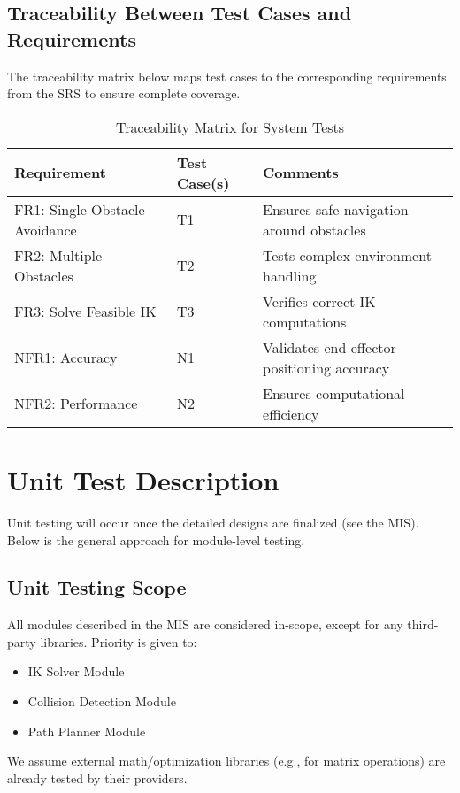 \documentclass[12pt, titlepage]{article}
\begin{document}
\subsection{Traceability Between Test Cases and Requirements}

The traceability matrix below maps test cases to the corresponding requirements from the SRS to ensure complete coverage.

\begin{table}[h!]
  \centering
  \caption{Traceability Matrix for System Tests}
  \begin{tabular}{l l l}
  \toprule
  \textbf{Requirement} & \textbf{Test Case(s)} & \textbf{Comments} \\
  \midrule
  FR1: Single Obstacle Avoidance & T1 & Ensures safe navigation around obstacles \\
  FR2: Multiple Obstacles & T2 & Tests complex environment handling \\
  FR3: Solve Feasible IK & T3 & Verifies correct IK computations \\
  NFR1: Accuracy & N1 & Validates end-effector positioning accuracy \\
  NFR2: Performance & N2 & Ensures computational efficiency \\
  \bottomrule
  \end{tabular}
\end{table}


\section{Unit Test Description}
Unit testing will occur once the detailed designs are finalized (see the MIS). Below is the general approach for module-level testing.

\subsection{Unit Testing Scope}

All modules described in the MIS are considered in-scope, except for any third-party libraries. Priority is given to:
\begin{itemize}
    \item IK Solver Module
    \item Collision Detection Module
    \item Path Planner Module
\end{itemize}
We assume external math/optimization libraries (e.g., for matrix operations) are already tested by their providers.
\end{document}
